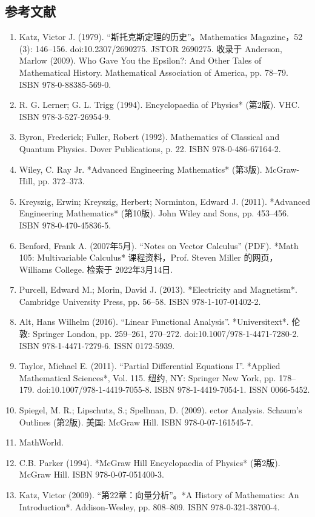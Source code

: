 \subsection{参考文献}
\begin{enumerate}
\item Katz, Victor J. (1979). “斯托克斯定理的历史”。Mathematics Magazine，52 (3): 146–156. doi:10.2307/2690275. JSTOR 2690275. 收录于 Anderson, Marlow (2009). Who Gave You the Epsilon?: And Other Tales of Mathematical History. Mathematical Association of America, pp. 78–79. ISBN 978-0-88385-569-0.
\item R. G. Lerner; G. L. Trigg (1994). Encyclopaedia of Physics* (第2版). VHC. ISBN 978-3-527-26954-9.
\item Byron, Frederick; Fuller, Robert (1992). Mathematics of Classical and Quantum Physics. Dover Publications, p. 22. ISBN 978-0-486-67164-2.
\item Wiley, C. Ray Jr. *Advanced Engineering Mathematics* (第3版). McGraw-Hill, pp. 372–373.
\item Kreyszig, Erwin; Kreyszig, Herbert; Norminton, Edward J. (2011). *Advanced Engineering Mathematics* (第10版). John Wiley and Sons, pp. 453–456. ISBN 978-0-470-45836-5.
\item Benford, Frank A. (2007年5月). “Notes on Vector Calculus” (PDF). *Math 105: Multivariable Calculus* 课程资料，Prof. Steven Miller 的网页，Williams College. 检索于 2022年3月14日.
\item Purcell, Edward M.; Morin, David J. (2013). *Electricity and Magnetism*. Cambridge University Press, pp. 56–58. ISBN 978-1-107-01402-2.
\item Alt, Hans Wilhelm (2016). “Linear Functional Analysis”. *Universitext*. 伦敦: Springer London, pp. 259–261, 270–272. doi:10.1007/978-1-4471-7280-2. ISBN 978-1-4471-7279-6. ISSN 0172-5939.
\item Taylor, Michael E. (2011). “Partial Differential Equations I”. *Applied Mathematical Sciences*, Vol. 115. 纽约, NY: Springer New York, pp. 178–179. doi:10.1007/978-1-4419-7055-8. ISBN 978-1-4419-7054-1. ISSN 0066-5452.
\item Spiegel, M. R.; Lipschutz, S.; Spellman, D. (2009). ector Analysis. Schaum's Outlines (第2版). 美国: McGraw Hill. ISBN 978-0-07-161545-7.
\item MathWorld.
\item C.B. Parker (1994). *McGraw Hill Encyclopaedia of Physics* (第2版). McGraw Hill. ISBN 978-0-07-051400-3.
\item Katz, Victor (2009). “第22章：向量分析”。*A History of Mathematics: An Introduction*. Addison-Wesley, pp. 808–809. ISBN 978-0-321-38700-4.

\end{enumerate}
